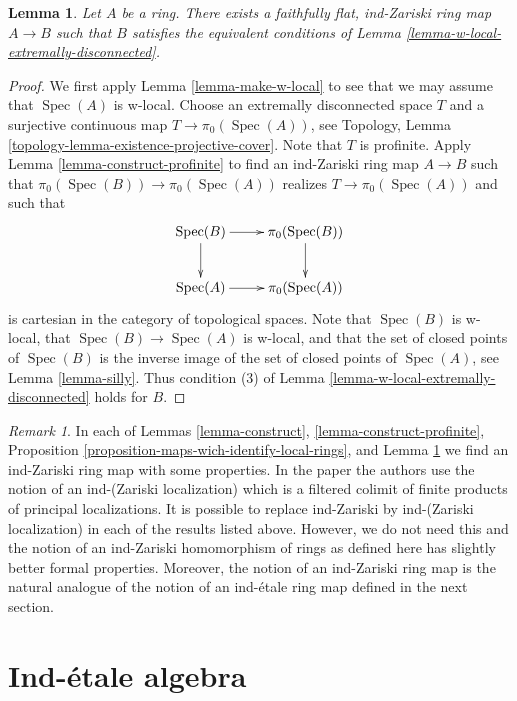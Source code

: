 \documentclass{stacks-project}
\theoremstyle{plain}
\newtheorem{lemma}[subsection]{Lemma}
\theoremstyle{definition}
\theoremstyle{remark}
\newtheorem{remark}[subsection]{Remark}
\numberwithin{equation}{subsection}
\def\Spec{\mathop{\mathrm{Spec}}}
\begin{document}
\begin{lemma}
\label{lemma-find-Zariski-w-contractible}
Let $A$ be a ring. There exists a faithfully flat, ind-Zariski ring
map $A \to B$ such that $B$ satisfies the equivalent conditions
of Lemma \ref{lemma-w-local-extremally-disconnected}.
\end{lemma}

\begin{proof}
We first apply Lemma \ref{lemma-make-w-local} to see that we may assume that
$\Spec(A)$ is w-local.
Choose an extremally disconnected space $T$ and a surjective
continuous map $T \to \pi_0(\Spec(A))$, see
Topology, Lemma \ref{topology-lemma-existence-projective-cover}.
Note that $T$ is profinite. Apply Lemma \ref{lemma-construct-profinite}
to find an ind-Zariski ring map $A \to B$ such that
$\pi_0(\Spec(B)) \to \pi_0(\Spec(A))$ realizes $T \to \pi_0(\Spec(A))$
and such that
$$
\xymatrix{
\Spec(B) \ar[r] \ar[d] & \pi_0(\Spec(B)) \ar[d] \\
\Spec(A) \ar[r] & \pi_0(\Spec(A))
}
$$
is cartesian in the category of topological spaces. Note that $\Spec(B)$
is w-local, that $\Spec(B) \to \Spec(A)$ is w-local, and that the
set of closed points of $\Spec(B)$ is the inverse image of the
set of closed points of $\Spec(A)$, see Lemma \ref{lemma-silly}.
Thus condition (3) of
Lemma \ref{lemma-w-local-extremally-disconnected}
holds for $B$.
\end{proof}

\begin{remark}
\label{remark-slightly-stronger}
In each of Lemmas \ref{lemma-construct}, \ref{lemma-construct-profinite},
Proposition \ref{proposition-maps-wich-identify-local-rings}, and
Lemma \ref{lemma-find-Zariski-w-contractible} we find an ind-Zariski ring
map with some properties. In the paper \cite{BS} the authors use the notion
of an ind-(Zariski localization) which is a filtered colimit of finite
products of principal localizations. It is possible to replace ind-Zariski
by ind-(Zariski localization) in each of the results listed above.
However, we do not need this and the notion of an ind-Zariski homomorphism
of rings as defined here has slightly better formal properties. Moreover,
the notion of an ind-Zariski ring map is the natural analogue of the
notion of an ind-\'etale ring map defined in the next section.
\end{remark}




\section{Ind-\'etale algebra}
\label{section-ind-etale}
\end{document}
